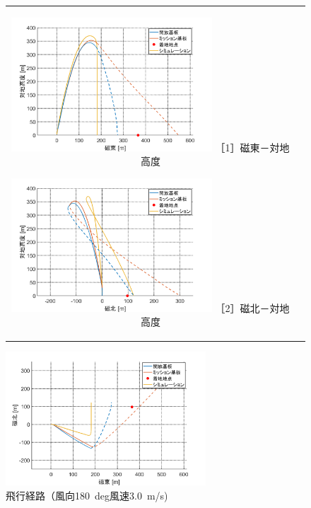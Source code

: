 \documentclass[a4paper,11pt,titlepage,uplatex]{jsarticle}
\begin{document}
\begin{figure}[H]
    \begin{tabular}{cc}
        \begin{minipage}{.48\textwidth}
            \centering
            \includegraphics[width=75mm]{pic_sim/pos3_eh.png}
            \hspace{16mm} {\small［1］磁東－対地高度}
        \end{minipage}
        \begin{minipage}{.48\textwidth}
            \centering
            \includegraphics[width=75mm]{pic_sim/pos3_nh.png}
            \hspace{16mm} {\small［2］磁北－対地高度}
        \end{minipage}
    \end{tabular}
    \centering
    \begin{minipage}{.48\textwidth}
        \centering
        \includegraphics[width=75mm]{pic_sim/pos3_en.png}
        \hspace{16mm}{\small［3］磁東－磁北}
    \end{minipage}
    \caption{飛行経路（風向\SI{180}{deg}風速\SI{3.0}{m/s})}
    \label{fig:hikoukeirosim}
\end{figure}
\end{document}
